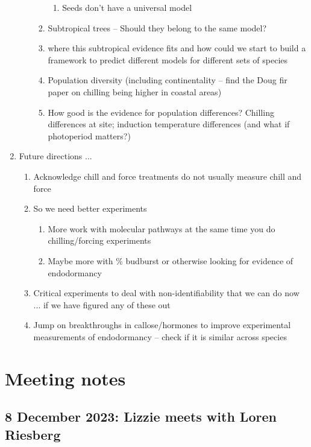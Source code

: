 \documentclass[11pt,letter]{article}
\begin{document}
\begin{enumerate}
\begin{enumerate}
\begin{enumerate}
\begin{enumerate}
\item Seeds don't have a universal model
\end{enumerate}
\item Subtropical trees -- Should they belong to the same model?
\item where this subtropical evidence fits and how could we start to build a framework to predict different models for different sets of species  %
\item Population diversity (including continentality -- find the Doug fir paper on chilling being higher in coastal areas)
\item How good is the evidence for population differences? Chilling differences at site; induction temperature differences (and what if photoperiod matters?)
\end{enumerate}
\end{enumerate}
\item Future directions ... 
\begin{enumerate}
\item Acknowledge chill and force treatments do not usually measure chill and force
\item So we need better experiments
\begin{enumerate}
\item More work with molecular pathways at the same time you do chilling/forcing experiments
\item Maybe more with \% budburst or otherwise looking for evidence of endodormancy
\end{enumerate}
\item Critical experiments to deal with non-identifiability that we can do now ... if we have figured any of these out
\item Jump on breakthroughs in callose/hormones to improve experimental measurements of endodormancy -- check if it is similar across species
\end{enumerate}
\end{enumerate}


\clearpage

\section{Meeting notes}
\subsection{8 December 2023: Lizzie meets with Loren Riesberg}
\end{document}
